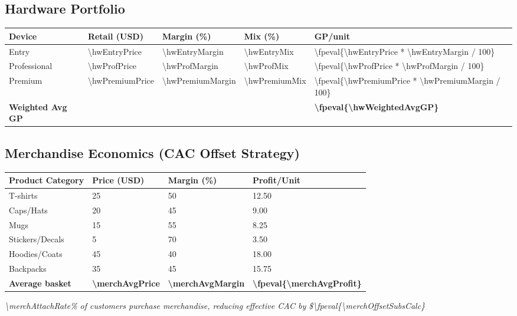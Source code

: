 \documentclass[11pt]{article}
\newcommand{\numfpeval}[1]{\num{\fpeval{#1}}}
\begin{document}
\subsection{Hardware Portfolio}
\begin{table}[H]
\centering
\begin{tabularx}{\linewidth}{l Y Y Y Y}
\toprule
Device & Retail (USD) & Margin (\%)\cite{industrybenchmark2024} & Mix (\%) & GP/unit \\\midrule
Entry        & \num{\hwEntryPrice}  & \num{\hwEntryMargin} & \num{\hwEntryMix} & \numfpeval{\hwEntryPrice * \hwEntryMargin / 100} \\
Professional & \num{\hwProfPrice} & \num{\hwProfMargin} & \num{\hwProfMix} & \numfpeval{\hwProfPrice * \hwProfMargin / 100} \\
Premium      & \num{\hwPremiumPrice} & \num{\hwPremiumMargin} & \num{\hwPremiumMix} & \numfpeval{\hwPremiumPrice * \hwPremiumMargin / 100} \\\midrule
\textbf{Weighted Avg GP} &  &  &  & \textbf{\numfpeval{\hwWeightedAvgGP}} \\
\bottomrule
\end{tabularx}
\end{table}

\subsection{Merchandise Economics (CAC Offset Strategy)}
\begin{table}[H]
\centering
\begin{tabularx}{\linewidth}{l Y Y Y}
\toprule
Product Category & Price (USD) & Margin (\%)\cite{printful2023} & Profit/Unit \\\midrule
T-shirts & \num{25} & \num{50} & \num{12.50} \\
Caps/Hats & \num{20} & \num{45} & \num{9.00} \\
Mugs & \num{15} & \num{55} & \num{8.25} \\
Stickers/Decals & \num{5} & \num{70} & \num{3.50} \\
Hoodies/Coats & \num{45} & \num{40} & \num{18.00} \\
Backpacks & \num{35} & \num{45} & \num{15.75} \\\midrule
\textbf{Average basket} & \textbf{\num{\merchAvgPrice}} & \textbf{\num{\merchAvgMargin}} & \textbf{\numfpeval{\merchAvgProfit}} \\
\bottomrule
\end{tabularx}
\end{table}
\textit{\num{\merchAttachRate}\% of customers purchase merchandise, reducing effective CAC by \$\numfpeval{\merchOffsetSubsCalc}}\cite{shopify2024}
\end{document}
